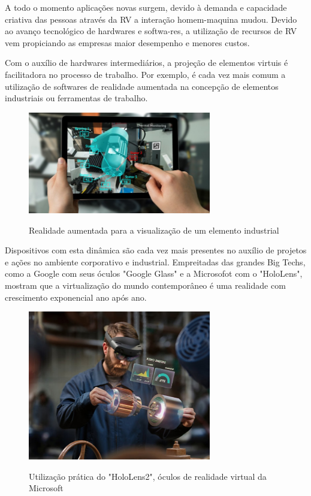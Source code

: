 \documentclass[a4paper, 12pt]{article}
\begin{document}
\begin{adjustwidth}{0.4\textwidth}{}
A todo  o  momento  aplicações  novas  surgem,  devido  à  demanda e capacidade  criativa  das  pessoas  através  da  RV  a  interação homem-maquina  mudou.  Devido ao avanço tecnológico de hardwares e softwa-res, a utilização de recursos de RV vem propiciando as empresas maior desempenho e menores custos. \citep{rodrigues2013}
\end{adjustwidth}

Com o auxílio de hardwares intermediários, a projeção de elementos virtuis é facilitadora no processo de trabalho. Por exemplo, é cada vez mais comum a utilização de softwares de realidade aumentada na concepção de elementos industriais ou ferramentas de trabalho.

\begin{figure}[H]
    \centering
    \includegraphics[width=8cm]{imagens/realidade aumentada industria.jpg}
    \caption{Realidade aumentada para a visualização de um elemento industrial}
    \label{fig:my_label}
    \citep{industry}
\end{figure}

Dispositivos com esta dinâmica são cada vez mais presentes no auxílio de projetos e ações no ambiente corporativo e industrial. Empreitadas das grandes Big Techs, como a Google com seus óculos "Google Glass" e a Microsofot com o "HoloLens", mostram que a virtualização do mundo contemporâneo é uma realidade com crescimento exponencial ano após ano. 

\begin{figure}[H]
    \centering
    \includegraphics[width=8cm]{imagens/hololens.jpg}
    \caption{Utilização prática do "HoloLens2", óculos de realidade virtual da Microsoft}
    \label{fig:my_label}
    \citep{hololens}
\end{figure}
\end{document}
